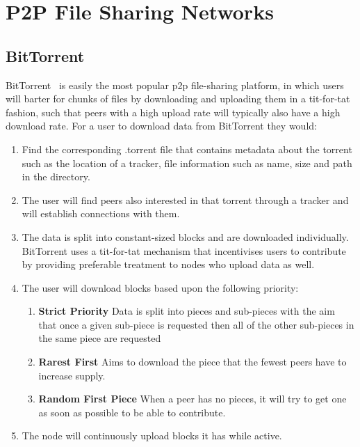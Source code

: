 
\section{P2P File Sharing Networks}

\subsection{BitTorrent}

BitTorrent~\cite{cohen_incentives_nodate,kaune_unraveling_2010,pouwelse_bittorrent_2005} is easily the most popular p2p file-sharing platform, in which users will barter for chunks of files by downloading and uploading them in a tit-for-tat fashion, such that peers with a high upload rate will typically also have a high download rate. For a user to download data from BitTorrent they would:

\begin{enumerate}
  \item Find the corresponding .torrent file that contains metadata about the torrent such as the location of a tracker, file information such as name, size and path in the directory.
  \item The user will find peers also interested in that torrent through a tracker and will establish connections with them.
  \item The data is split into constant-sized blocks and are downloaded individually. BitTorrent uses a tit-for-tat mechanism that incentivises users to contribute by providing preferable treatment to nodes who upload data as well.
  \item The user will download blocks based upon the following priority:
        \begin{enumerate}
          \item \textbf{Strict Priority} Data is split into pieces and sub-pieces with the aim that once a given sub-piece is requested then all of the other sub-pieces in the same piece are requested
          \item \textbf{Rarest First} Aims to download the piece that the fewest peers have to increase supply.
          \item \textbf{Random First Piece} When a peer has no pieces, it will try to get one as soon as possible to be able to contribute.
        \end{enumerate}
  \item The node will continuously upload blocks it has while active.
\end{enumerate}

